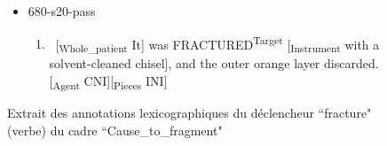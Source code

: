 \documentclass[xcolor=table]{beamer}
\begin{document}
\begin{frame}
\begin{figure}
\begin{itemize}
			\item 680-s20-pass
			\begin{enumerate}\tiny
				\item \ [\textsubscript{\color{red}Whole\_patient} It] was FRACTURED\textsuperscript{\color{red}Target} [\textsubscript{\color{red}Instrument} with a solvent-cleaned chisel], and the outer orange layer discarded. [\textsubscript{\color{red}Agent} CNI][\textsubscript{\color{red}Pieces} INI] 
			\end{enumerate}
			
		\end{itemize}
		
		\caption{Extrait des annotations lexicographiques du déclencheur ``fracture" (verbe) du cadre ``Cause\_to\_fragment"}
	\end{figure}
	
\end{frame}

%
%	
%	
%
%
%	
%	
\end{document}
